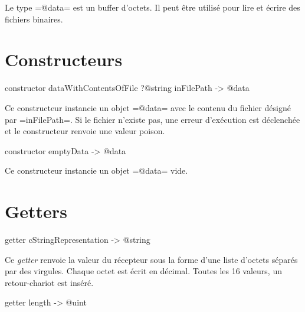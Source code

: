 

Le type \ggs=@data= est un buffer d'octets. Il peut être utilisé pour lire et écrire des fichiers binaires.




\section{Constructeurs}



\begin{galgas}
constructor dataWithContentsOfFile ?@string inFilePath -> @data
\end{galgas}

Ce constructeur instancie un objet \ggs=@data= avec le contenu du fichier désigné par \ggs=inFilePath=. Si le fichier n'existe pas, une erreur d'exécution est déclenchée et le constructeur renvoie une valeur poison.





\begin{galgas}
constructor emptyData -> @data
\end{galgas}

Ce constructeur instancie un objet \ggs=@data= vide.








\section{Getters}



\begin{galgas}
getter cStringRepresentation -> @string
\end{galgas}

Ce \emph{getter} renvoie la valeur du récepteur sous la forme d'une liste d'octets séparés par des virgules. Chaque octet est écrit en décimal. Toutes les 16 valeurs, un retour-chariot est inséré.




\begin{galgas}
getter length -> @uint
\end{galgas}


